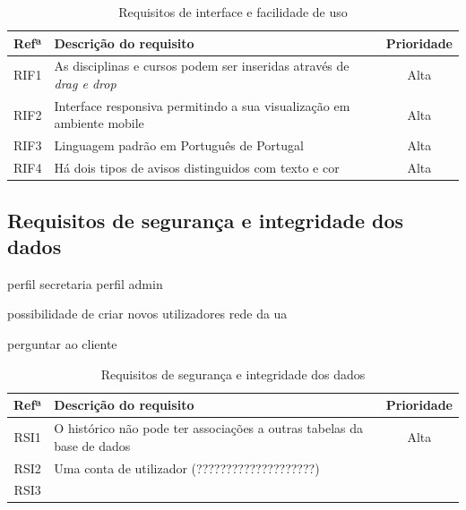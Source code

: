 \documentclass[11pt, twoside]{report}
\begin{document}
	
	\begin{table}[H]
	\caption{Requisitos de interface e facilidade de uso}
	
	\begin{center}
		\begin{tabularx}{\textwidth}{|c|X|c|}
			\hline
			\textbf{Refª }	& \textbf{Descrição do requisito} & \textbf{Prioridade} \\
			\hline
			RIF1 & As disciplinas e cursos podem ser inseridas através de \textit{drag e drop} &Alta\\
			\hline
			RIF2 & Interface responsiva permitindo a sua visualização em ambiente mobile &Alta\\
			\hline
			RIF3 & Linguagem padrão em Português de Portugal &Alta\\
			\hline
			RIF4 & Há dois tipos de avisos distinguidos com texto e cor &Alta\\
			\hline
		\end{tabularx}
		\label{requisitosdeinterface}
	\end{center}
	\end{table}

	\subsection{Requisitos de segurança e integridade dos dados}
	
	perfil secretaria 
perfil admin

possibilidade de criar novos utilizadores
rede da ua

perguntar ao cliente
\begin{table}[H]	
	\caption{Requisitos de segurança e integridade dos dados}
	
	
	\begin{center}
		\begin{tabularx}{\textwidth}{|c|X|c|}
			\hline
			\textbf{Refª }	& \textbf{Descrição do requisito} & \textbf{Prioridade} \\
			\hline
			RSI1 &O histórico não pode ter associações a outras tabelas da base de dados  &Alta\\
			\hline
			RSI2 & Uma conta de utilizador (????????????????????)&\\
			\hline
			RSI3 & &\\
			\hline
		\end{tabularx}
		\label{requisitosdeseguranca}
	\end{center}
\end{table}
\end{document}
